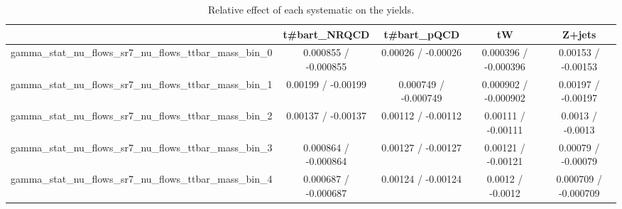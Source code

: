 \documentclass[10pt]{article}
\begin{document}
\begin{table}[htbp]
\begin{center}
\begin{tabular}{|c|c|c|c|c|}
\hline 
      & t#bar{t}_{NRQCD}      & t#bar{t}_{pQCD}      & tW      & Z+jets \\ 
\hline 
  gamma_stat_nu_flows_sr7_nu_flows_ttbar_mass_bin_0 & 0.000855 / -0.000855 & 0.00026 / -0.00026 & 0.000396 / -0.000396 & 0.00153 / -0.00153 \\ 
  gamma_stat_nu_flows_sr7_nu_flows_ttbar_mass_bin_1 & 0.00199 / -0.00199 & 0.000749 / -0.000749 & 0.000902 / -0.000902 & 0.00197 / -0.00197 \\ 
  gamma_stat_nu_flows_sr7_nu_flows_ttbar_mass_bin_2 & 0.00137 / -0.00137 & 0.00112 / -0.00112 & 0.00111 / -0.00111 & 0.0013 / -0.0013 \\ 
  gamma_stat_nu_flows_sr7_nu_flows_ttbar_mass_bin_3 & 0.000864 / -0.000864 & 0.00127 / -0.00127 & 0.00121 / -0.00121 & 0.00079 / -0.00079 \\ 
  gamma_stat_nu_flows_sr7_nu_flows_ttbar_mass_bin_4 & 0.000687 / -0.000687 & 0.00124 / -0.00124 & 0.0012 / -0.0012 & 0.000709 / -0.000709 \\ 
\hline 
\end{tabular} 
\caption{Relative effect of each systematic on the yields.} 
\end{center} 
\end{table} 
\end{document}
